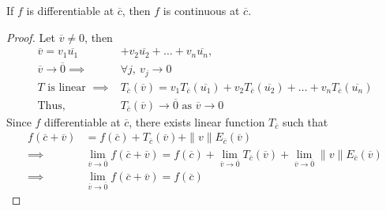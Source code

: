 \begin{theorem}
	If $f$ is differentiable at \( \overline{c} \), then $f$ is continuous at \( \overline{c} \).
\end{theorem}
\begin{proof}
	Let $\overline{v} \ne 0$, then
	\begin{align*}
		\overline{v} = v_1 \overline{u_1} & + v_2 \overline{u_2} + \dots + v_n \overline{u_n},\\
		\overline{v} \to \overline{0} \implies & \forall j,\ v_j \to 0 \\
		T \text{ is linear }\implies & T_{\overline{c}} (\overline{v}) = v_1 T_{\overline{c}}(\overline{u_1}) + v_2 T_{\overline{c}}(\overline{u_2}) + \dots + v_n T_{\overline{c}}(\overline{u_n})\\
		\text{Thus, } & T_{\overline{c}}(\overline{v}) \to \overline{0} \text{ as } \overline{v} \to 0
	\end{align*}
	Since $f$ differentiable at \( \overline{c} \), there exists linear function $T_{\overline{c}}$ such that
	\begin{align*}
		f(\overline{c}+\overline{v}) & =  f(\overline{c}) + T_{\overline{c}}(\overline{v}) + \|v\|E_{\overline{c}}(\overline{v}) \\
		\implies & \lim_{\overline{v} \to \overline{0}} f(\overline{c}+\overline{v}) = f(\overline{c}) + \lim_{\overline{v} \to \overline{0}} T_{\overline{c}}(\overline{v}) + \lim_{\overline{v} \to \overline{0}} \|v\|E_{\overline{c}}(\overline{v})\\
		\implies & \lim_{\overline{v} \to \overline{0}} f(\overline{c}+\overline{v}) = f(\overline{c})
	\end{align*}
\end{proof}

